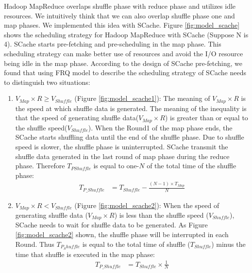 {Hadoop MapReduce overlaps shuffle phase with reduce phase and utilizes idle resources. We intuitively think that we can also overlap shuffle phase one and map phases. We implemented this idea with SCache.
Figure \ref{fig:model_scache} shows the scheduling strategy for Hadoop MapReduce with SCache (Suppose N is 4). SCache starts pre-fetching and pre-scheduling in the map phase. This scheduling strategy can make better use of resources and avoid the I/O resource being idle in the map phase. According to the design of SCache pre-fetching, we found that using FRQ model to describe the scheduling strategy of SCache needs to distinguish two situations:

\begin{enumerate}
    \item 
    \(V_{Map} \times R \ge V_{Shuffle}\) (Figure \ref{fig:model_scache1}): 
	The meaning of \(V_{Map} \times R\) is the speed at which shuffle data is generated. The meaning of the inequality is that the speed of generating shuffle data(\(V_{Map} \times R\)) is greater than or equal to the shuffle speed(\(V_{Shuffle}\)). When the Round1 of the map phase ends, the SCache starts shuffling data until the end of the shuffle phase. Due to shuffle speed is slower, the shuffle phase is uninterrupted. SCache transmit the shuffle data generated in the last round of map phase during the reduce phase. Therefore \(T_{PShuffle}\) is equal to one-\(N\) of the total time of the shuffle phase:
	\begin{equation}
		\label{equation_Tpshuffle1}
		\begin{aligned}
			T_{P\_Shuffle} &= T_{Shuffle} - \frac{(N - 1)\times T_{Map}}{N}
		\end{aligned}
	\end{equation}
	
    \item \(V_{Map} \times R < V_{Shuffle}\) (Figure \ref{fig:model_scache2}): 
	When the speed of generating shuffle data (\(V_{Map} \times R\)) is less than the shuffle speed (\(V_{Shuffle}\)), SCache needs to wait for shuffle data to be generated. As Figure \ref{fig:model_scache2} shown, the shuffle phase will be interrupted in each Round. Thus \(T_{P_Shuffle}\) is equal to the total time of shuffle (\(T_{Shuffle}\)) minus the time that shuffle is executed in the map phase:
	\begin{equation}
		\label{equation_Tpshuffle2}
		\begin{aligned}
			T_{P\_Shuffle} &= T_{Shuffle} \times \frac{1}{N}
		\end{aligned}
	\end{equation}
\end{enumerate}

}

